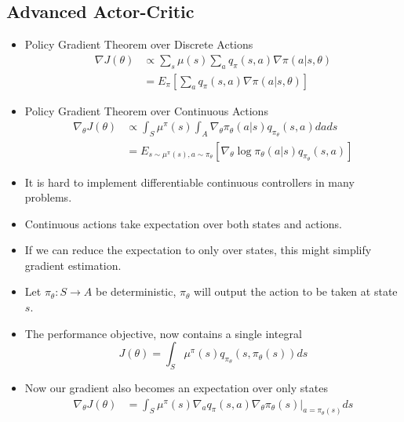 \documentclass[a4paper]{article}
\begin{document}
\subsection{Advanced Actor-Critic}
\begin{itemize}
    \item Policy Gradient Theorem over Discrete Actions
    \begin{equation*}
        \begin{split}
            \nabla J(\theta)& \propto \sum_s\mu(s)\sum_aq_{\pi}(s,a)\nabla \pi(a|s,\theta)\\
            &=E_\pi[\sum_aq_{\pi}(s,a)\nabla \pi(a|s,\theta)]
        \end{split}
    \end{equation*}
    \item Policy Gradient Theorem over Continuous Actions
    \begin{equation*}
        \begin{split}
            \nabla_\theta J(\theta)& \propto \int_S \mu^\pi(s)\int_A\nabla_\theta \pi_\theta(a|s)q_{\pi_\theta}(s,a)dads\\
            &=E_{s\sim \mu^\pi(s),a\sim \pi_\theta}[\nabla_\theta \log{\pi_\theta(a|s)}q_{\pi_\theta}(s,a)]
        \end{split}
    \end{equation*}
    \item It is hard to implement differentiable continuous controllers in many problems.
    \item Continuous actions take expectation over both states and actions.
    \item If we can reduce the expectation to only over states, this might simplify gradient estimation.
    \item Let $\pi_\theta:S\to A$ be deterministic, $\pi_\theta$ will output the action to be taken at state $s$.
    \item The performance objective, now contains a single integral
    \begin{equation*}
        J(\theta)=\int_S\mu^\pi(s)q_{\pi_\theta}(s,\pi_\theta(s))ds
    \end{equation*}
    \item Now our gradient also becomes an expectation over only states
    \begin{equation*}
        \begin{split}
            \nabla_\theta J(\theta)&=\int_S\mu^\pi(s)\nabla_aq_\pi(s,a)\nabla_\theta \pi_\theta(s)|_{a=\pi_\theta(s)}ds\\

\end{split}
\end{equation*}
\end{itemize}
\end{document}
